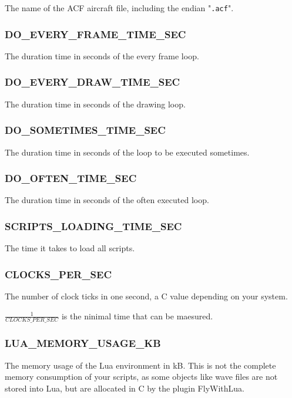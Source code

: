 \documentclass[11pt,parskip=half,a4paper]{scrartcl}
\begin{document}
The name of the ACF aircraft file, including the endian "\verb|.acf|".

\subsubsection{DO\_EVERY\_FRAME\_TIME\_SEC}

The duration time in seconds of the every frame loop.

\subsubsection{DO\_EVERY\_DRAW\_TIME\_SEC}

The duration time in seconds of the drawing loop.

\subsubsection{DO\_SOMETIMES\_TIME\_SEC}

The duration time in seconds of the loop to be executed sometimes.

\subsubsection{DO\_OFTEN\_TIME\_SEC}

The duration time in seconds of the often executed loop.

\subsubsection{SCRIPTS\_LOADING\_TIME\_SEC}

The time it takes to load all scripts.

\subsubsection{CLOCKS\_PER\_SEC}

The number of clock ticks in one second, a C value depending on your system.

$\frac{1}{CLOCKS\_PER\_SEC}$ is the ninimal time that can be maesured.

\subsubsection{LUA\_MEMORY\_USAGE\_KB}

The memory usage of the Lua environment in kB. This is not the complete memory consumption of your scripts, as some objects like wave files are not stored into Lua, but are allocated in C by the plugin FlyWithLua.
\end{document}
